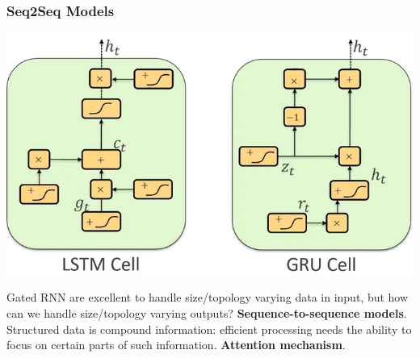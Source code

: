 \documentclass[10pt]{report}
\begin{document}
\subsubsection{Seq2Seq Models}
\begin{center}
	\includegraphics[scale=0.5]{106.png}
\end{center}
Gated RNN are excellent to handle size/topology varying data in input, but how can we handle size/topology varying outputs? \textbf{Sequence-to-sequence models}.\\
Structured data is compound information: efficient processing needs the ability to focus on certain parts of such information. \textbf{Attention mechanism}.
\end{document}
